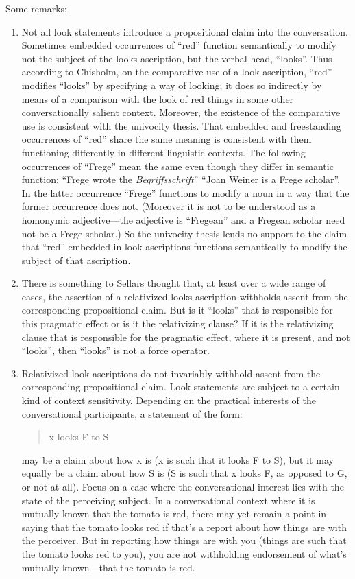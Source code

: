 \documentclass[11pt]{article}
\begin{document}
Some remarks:
\begin{enumerate}
    \item Not all look statements introduce a propositional claim into the conversation. Sometimes embedded occurrences of ``red'' function semantically to modify not the subject of the looks-ascription, but the verbal head, ``looks''. Thus according to Chisholm, on the comparative use of a look-ascription, ``red'' modifies ``looks'' by specifying a way of looking; it does so indirectly by means of a comparison with the look of red things in some other conversationally salient context. Moreover, the existence of the comparative use is consistent with the univocity thesis. That embedded and freestanding occurrences of ``red'' share the same meaning is consistent with them functioning differently in different linguistic contexts. The following occurrences of ``Frege'' mean the same even though they differ in semantic function: ``Frege wrote the \emph{Begriffsschrift}'' ``Joan Weiner is a Frege scholar''. In the latter occurrence ``Frege'' functions to modify a noun in a way that the former occurrence does not. (Moreover it is not to be understood as a homonymic adjective---the adjective is ``Fregean'' and a Fregean scholar need not be a Frege scholar.) So the univocity thesis lends no support to the claim that ``red'' embedded in look-ascriptions functions semantically to modify the subject of that ascription.
    \item There is something to Sellars thought that, at least over a wide range of cases, the assertion of a relativized looks-ascription withholds assent from the corresponding propositional claim. But is it ``looks'' that is responsible for this pragmatic effect or is it the relativizing clause? If it is the relativizing clause that is responsible for the pragmatic effect, where it is present, and not ``looks'', then ``looks'' is not a force operator.
    \item Relativized look ascriptions do not invariably withhold assent from the corresponding propositional claim. Look statements are subject to a certain kind of context sensitivity. Depending on the practical interests of the conversational participants, a statement of the form:
    \begin{quote}
        x looks F to S
    \end{quote}
    may be a claim about how x is (x is such that it looks F to S), but it may equally be a claim about how S is (S is such that x looks F, as opposed to G, or not at all). Focus on a case where the conversational interest lies with the state of the perceiving subject. In a conversational context where it is mutually known that the tomato is red, there may yet remain a point in saying that the tomato looks red if that's a report about how things are with the perceiver. But in reporting how things are with you (things are such that the tomato looks red to you), you are not withholding endorsement of what's mutually known---that the tomato is red.

\end{enumerate}
\end{document}
